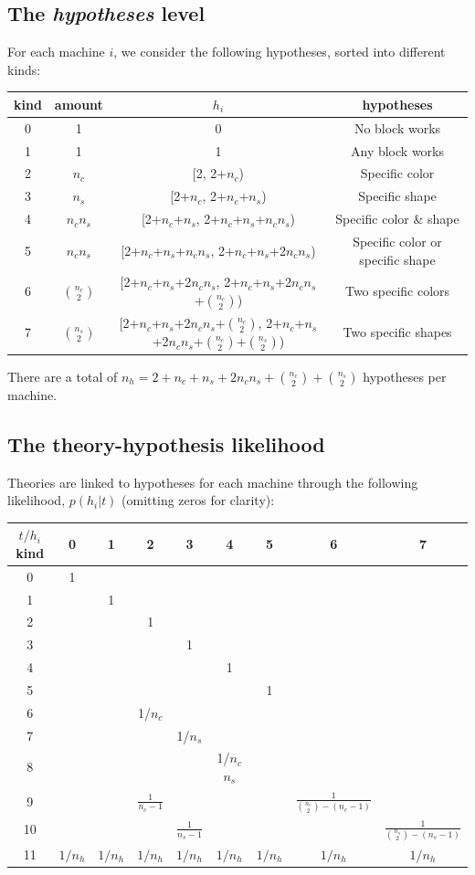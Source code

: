 \documentclass[11pt, a4paper]{article}
\begin{document}
\subsection*{The \emph{hypotheses} level}
For each machine $i$, we consider the following hypotheses, sorted into different kinds:\\
\begin{tabular}{|c|c|c|c|}
\hline
kind  & amount & $h_i$ & hypotheses \\
\hline
0 & 1& 0 & No block works\\
1 & 1 & 1 & Any block works\\
2 & $n_c$ & [2, 2+$n_c$) & Specific color\\
3 & $n_s$ & [2+$n_c$, 2+$n_c$+$n_s$) & Specific shape\\
4 & $n_c$$n_s$ & [2+$n_c$+$n_s$, 2+$n_c$+$n_s$+$n_c$$n_s$) & Specific color \& shape\\
5 & $n_c$$n_s$ & [2+$n_c$+$n_s$+$n_c$$n_s$, 2+$n_c$+$n_s$+2$n_c$$n_s$) & Specific color or specific shape\\
6 & $n_c\choose2$ & [2+$n_c$+$n_s$+2$n_c$$n_s$, 2+$n_c$+$n_s$+2$n_c$$n_s$+$n_c\choose2$) & Two specific colors\\
7 & $n_s\choose2$&  [2+$n_c$+$n_s$+2$n_c$$n_s$+$n_c\choose2$, 2+$n_c$+$n_s$+2$n_c$$n_s$+$n_c\choose2$+$n_s\choose2$) &Two specific shapes\\
\hline
\end{tabular}
There are a total of $n_h=2+n_c+n_s+2 n_c n_s+ {n_c \choose 2 }+ {n_s \choose 2}$ hypotheses per machine. 


\subsection*{The theory-hypothesis likelihood}
Theories are linked to hypotheses for each machine through the following likelihood, $p(h_i|t)$ (omitting zeros for clarity):\\
\begin{tabular}{|c|c|c|c|c|c|c|c|c|}
\hline
$t/h_i$ kind & 0 & 1 & 2 & 3 & 4 & 5 & 6 & 7 \\
\hline
0 & 1 & & & & & & & \\
1 & & 1 & & & & & &\\
2 & & & 1 & & & & &\\
3 & & & & 1 & & & &\\
4 & & & & & 1 & & &\\
5 & & & & & & 1 & &\\
6 & & & 1/$n_c$ & & & & &\\
7 & & & & 1/$n_s$ & & & &\\
8 & & & & & 1/$n_c$$n_s$ & & &\\
9 & & & $\frac{1}{n_c-1}$ & & & & $\frac{1}{{n_c\choose 2} -(n_c-1)} $ &\\
10 & & & & $\frac{1}{n_s-1}$ & & & &$\frac{1}{{n_s\choose 2} -(n_s-1)} $ \\
11 & $1/n_h$ & $1/n_h$ & $1/n_h$ & $1/n_h$ & $1/n_h$ & $1/n_h$ & $1/n_h$ & $1/n_h$ \\
\hline
\end{tabular}
\end{document}
